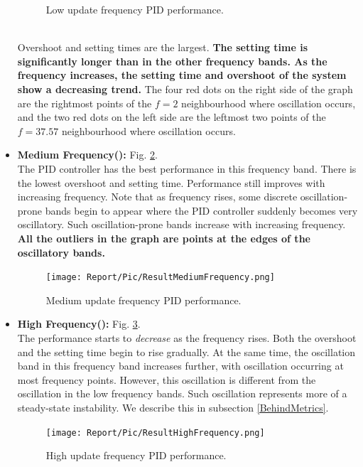 \documentclass[conference]{IEEEtran}
\begin{document}
\begin{itemize}
\begin{figure}[htbp]
        \caption{Low update frequency PID performance.}
        \label{fig_LowFrequency}
        \end{figure}
        \\Overshoot and setting times are the largest. \textbf{The setting time is significantly longer than in the other frequency bands. As the frequency increases, the setting time and overshoot of the system show a decreasing trend.} The four red dots on the right side of the graph are the rightmost points of the $f=2$ neighbourhood where oscillation occurs, and the two red dots on the left side are the leftmost two points of the $f=37.57$ neighbourhood where oscillation occurs. 
    \item \textbf{Medium Frequency():} Fig. \ref{fig_MediumFrequency}.
        \\The PID controller has the best performance in this frequency band. There is the lowest overshoot and setting time. Performance still improves with increasing frequency. Note that as frequency rises, some discrete oscillation-prone bands begin to appear where the PID controller suddenly becomes very oscillatory. Such oscillation-prone bands increase with increasing frequency. \textbf{All the outliers in the graph are points at the edges of the oscillatory bands.}
        \begin{figure}
            \centering
            \texttt{[image: Report/Pic/ResultMediumFrequency.png]}
            \caption{Medium update frequency PID performance.}
            \label{fig_MediumFrequency}
        \end{figure}
    \item \textbf{High Frequency():} Fig. \ref{fig_HighFrequency}.
    \\
    The performance starts to \textit{decrease} as the frequency rises. Both the overshoot and the setting time begin to rise gradually. At the same time, the oscillation band in this frequency band increases further, with oscillation occurring at most frequency points. However, this oscillation is different from the oscillation in the low frequency bands. Such oscillation represents more of a steady-state instability. We describe this in subsection \ref{BehindMetrics}.
        \begin{figure}
            \centering
            \texttt{[image: Report/Pic/ResultHighFrequency.png]}
            \caption{High update frequency PID performance.}
            \label{fig_HighFrequency}
        \end{figure}
\end{itemize}
\end{document}
